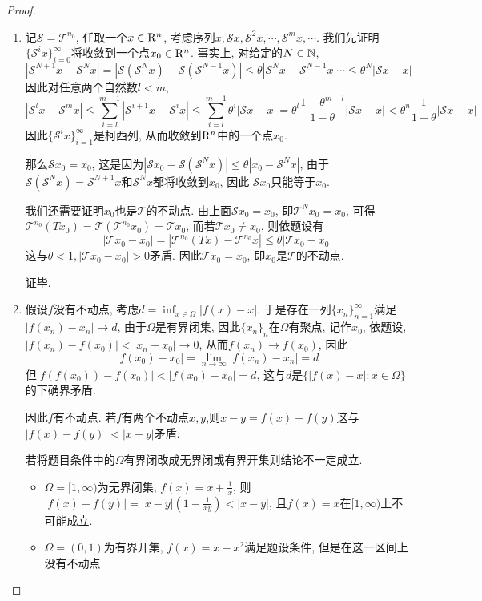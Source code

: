 \documentclass[a4paper,12pt]{article}
\begin{document}
\begin{proof}\ 
  \begin{enumerate}
    \item 记$\mathcal{S}=\mathcal{T}^{n_0}$, 任取一个$x\in\mathrm{R}^n$, 考虑序列$x,\mathcal{S}x,\mathcal{S}^2x,\cdots,\mathcal{S}^mx,\cdots$. 
      我们先证明$\{\mathcal{S}^ix\}_{i=0}^\infty$将收敛到一个点$x_0\in\mathrm{R}^n$. 事实上, 对给定的$N\in\mathbb{N}$, 
      \[|\mathcal{S}^{N+1}x-\mathcal{S}^Nx|=|\mathcal{S}(\mathcal{S}^Nx)-\mathcal{S}(\mathcal{S}^{N-1}x)|\leq\theta|\mathcal{S}^Nx-\mathcal{S}^{N-1}x|\cdots\leq\theta^N|\mathcal{S}x-x|\]
      因此对任意两个自然数$l<m$,
      \[|\mathcal{S}^lx-\mathcal{S}^mx|\leq\sum_{i=l}^{m-1}|\mathcal{S}^{i+1}x-\mathcal{S}^ix|\leq\sum_{i=l}^{m-1}\theta^i|\mathcal{S}x-x|=\theta^l\frac{1-\theta^{m-l}}{1-\theta}|\mathcal{S}x-x|<\theta^n\frac{1}{1-\theta}|\mathcal{S}x-x|\]
      因此$\{\mathcal{S}^ix\}_{i=1}^\infty$是柯西列, 从而收敛到$\mathrm{R}^n$中的一个点$x_0$.

      那么$\mathcal{S}x_0=x_0$, 这是因为$|\mathcal{S}x_0-\mathcal{S}(\mathcal{S}^Nx)|\leq\theta|x_0-\mathcal{S}^Nx|$, 由于$\mathcal{S}(\mathcal{S}^Nx)=\mathcal{S}^{N+1}x$和$\mathcal{S}^Nx$都将收敛到$x_0$, 因此
      $\mathcal{S}x_0$只能等于$x_0$.

      我们还需要证明$x_0$也是$\mathcal{T}$的不动点. 
      由上面$\mathcal{S}x_0=x_0$, 即$\mathcal{T}^Nx_0=x_0$, 
      可得$\mathcal{T}^{n_0}(Tx_0)=\mathcal{T}(\mathcal{T}^{n_0}x_0)=\mathcal{T}x_0$, 
      而若$\mathcal{T}x_0\neq x_0$, 则依题设有
      \[|\mathcal{T}x_0-x_0|=|\mathcal{T}^{n_0}(Tx)-\mathcal{T}^{n_0}x|\leq \theta|\mathcal{T}x_0-x_0|\]
      这与$\theta<1,|\mathcal{T}x_0-x_0|>0$矛盾. 因此$\mathcal{T}x_0=x_0$, 即$x_0$是$\mathcal{T}$的不动点.

      证毕.
    \item 假设$f$没有不动点, 考虑$d=\inf_{x\in\Omega}|f(x)-x|$. 于是存在一列$\{x_n\}_{n=1}^\infty$满足
      $|f(x_n)-x_n|\to d$, 由于$\Omega$是有界闭集, 因此$\{x_n\}_n$在$\Omega$有聚点, 记作$x_0$,
      依题设, $|f(x_n)-f(x_0)|<|x_n-x_0|\to0$, 从而$f(x_n)\to f(x_0)$, 因此
      \[|f(x_0)-x_0|=\lim_{n\to\infty}|f(x_n)-x_n|=d\]
      但$|f(f(x_0))-f(x_0)|<|f(x_0)-x_0|=d$, 这与$d$是$\{|f(x)-x|:x\in\Omega\}$的下确界矛盾.

      因此$f$有不动点. 若$f$有两个不动点$x,y$,则$x-y=f(x)-f(y)$这与$|f(x)-f(y)|<|x-y|$矛盾.

      若将题目条件中的$\Omega$有界闭改成无界闭或有界开集则结论不一定成立.
      \begin{itemize}
        \item $\Omega=[1,\infty)$为无界闭集, $f(x)=x+\frac{1}{x}$, 则$|f(x)-f(y)|=|x-y|(1-\frac{1}{xy})<|x-y|$, 且$f(x)=x$在$[1,\infty)$上不可能成立.
        \item $\Omega=(0,1)$为有界开集, $f(x)=x-x^2$满足题设条件, 但是在这一区间上没有不动点.
      \end{itemize}
  \end{enumerate}
\end{proof}
\end{document}
